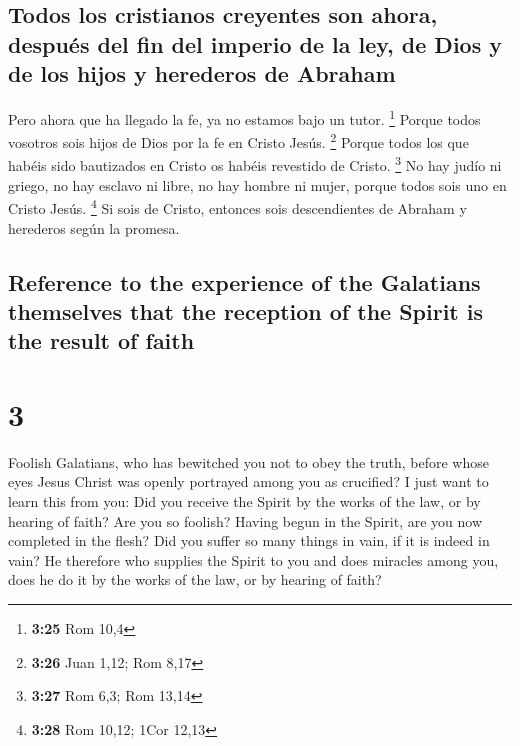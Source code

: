 \begin{paracol}{2}
\hypertarget{todos-los-cristianos-creyentes-son-ahora-despuuxe9s-del-fin-del-imperio-de-la-ley-de-dios-y-de-los-hijos-y-herederos-de-abraham}{%
\subsection{Todos los cristianos creyentes son ahora, después del fin
del imperio de la ley, de Dios y de los hijos y herederos de
Abraham}\label{todos-los-cristianos-creyentes-son-ahora-despuuxe9s-del-fin-del-imperio-de-la-ley-de-dios-y-de-los-hijos-y-herederos-de-abraham}}

 Pero ahora que ha llegado la fe, ya no estamos bajo un
tutor. \footnote{\textbf{3:25} Rom 10,4}  Porque todos
vosotros sois hijos de Dios por la fe en Cristo Jesús. \footnote{\textbf{3:26}
  Juan 1,12; Rom 8,17}  Porque todos los que habéis sido
bautizados en Cristo os habéis revestido de Cristo. \footnote{\textbf{3:27}
  Rom 6,3; Rom 13,14}  No hay judío ni griego, no hay
esclavo ni libre, no hay hombre ni mujer, porque todos sois uno en
Cristo Jesús. \footnote{\textbf{3:28} Rom 10,12; 1Cor 12,13}
 Si sois de Cristo, entonces sois descendientes de
Abraham y herederos según la promesa.

\switchcolumn
\begin{otherlanguage}{english}

\hypertarget{reference-to-the-experience-of-the-galatians-themselves-that-the-reception-of-the-spirit-is-the-result-of-faith}{%
\subsection{Reference to the experience of the Galatians themselves that
the reception of the Spirit is the result of
faith}\label{reference-to-the-experience-of-the-galatians-themselves-that-the-reception-of-the-spirit-is-the-result-of-faith}}

\hypertarget{section-5}{%
\section{3}\label{section-5}}

 Foolish Galatians, who has bewitched you not to obey the
truth, before whose eyes Jesus Christ was openly portrayed among you as
crucified?  I just want to learn this from you: Did you
receive the Spirit by the works of the law, or by hearing of faith?
 Are you so foolish? Having begun in the Spirit, are you
now completed in the flesh?  Did you suffer so many things
in vain, if it is indeed in vain?  He therefore who
supplies the Spirit to you and does miracles among you, does he do it by
the works of the law, or by hearing of faith?


\end{otherlanguage}
\end{paracol}
